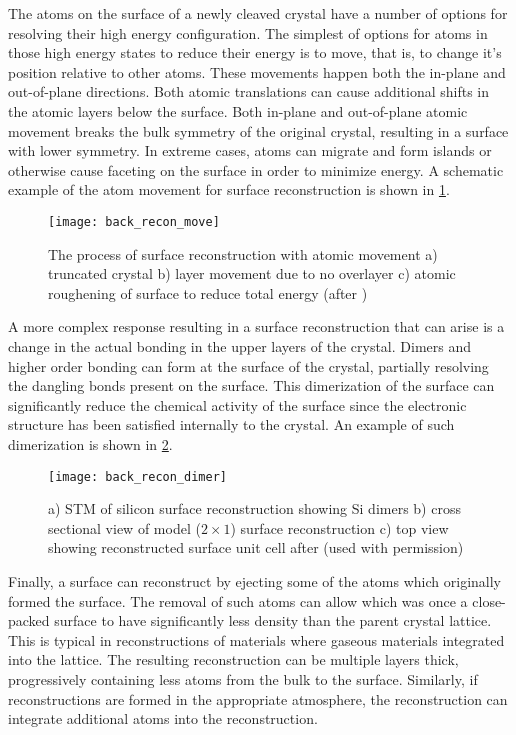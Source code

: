 The atoms on the surface of a newly cleaved crystal have a number of options for resolving their high energy configuration. The simplest of options for atoms in those high energy states to reduce their energy is to move, that is, to change it's position relative to other atoms. These movements happen both the in-plane and out-of-plane directions. Both atomic translations can cause additional shifts in the atomic layers below the surface.  Both in-plane and out-of-plane atomic movement breaks the bulk symmetry of the original crystal, resulting in a surface with lower symmetry. In extreme cases, atoms can migrate and form islands or otherwise cause faceting on the surface in order to minimize energy\cite{Duke1996,oura2010surface}. A schematic example of the atom movement for surface reconstruction is shown in \cref{fig:back_recon_move}.
\begin{figure}
    \centering
    \texttt{[image: back\_recon\_move]}
    \caption[Simple surface reconstruction]{\label{fig:back_recon_move}The process of surface reconstruction with atomic movement a) truncated crystal b) layer movement due to no overlayer c) atomic roughening of surface to reduce total energy (after \cite{ohring2001materials})}
\end{figure}

A more complex response resulting in a surface reconstruction that can arise is a change in the actual bonding in the upper layers of the crystal. Dimers and higher order bonding can form at the surface of the crystal, partially resolving the dangling bonds present on the surface. This dimerization of the surface can significantly reduce the chemical activity of the surface since the electronic structure has been satisfied internally to the crystal\cite{Duke1996}. An example of such dimerization is shown in \cref{fig:back_recon_dimer}.
\begin{figure}
    \centering
    \texttt{[image: back\_recon\_dimer]}
    \caption[Silicon dimer surface reconstruction]{\label{fig:back_recon_dimer}a) STM of silicon surface reconstruction showing Si dimers b) cross sectional view of model ($2 \times 1$) surface reconstruction c) top view showing reconstructed surface unit cell after \cite{Zhang1997,Lagally1993}(used with permission)}
\end{figure}

Finally, a surface can reconstruct by ejecting some of the atoms which originally formed the surface. The removal of such atoms can allow which was once a close-packed surface to have significantly less density than the parent crystal lattice. This is typical in reconstructions of materials where gaseous materials integrated into the lattice. The resulting reconstruction can be multiple layers thick, progressively containing less atoms from the bulk to the surface. Similarly, if reconstructions are formed in the appropriate atmosphere, the reconstruction can integrate additional atoms into the reconstruction.

